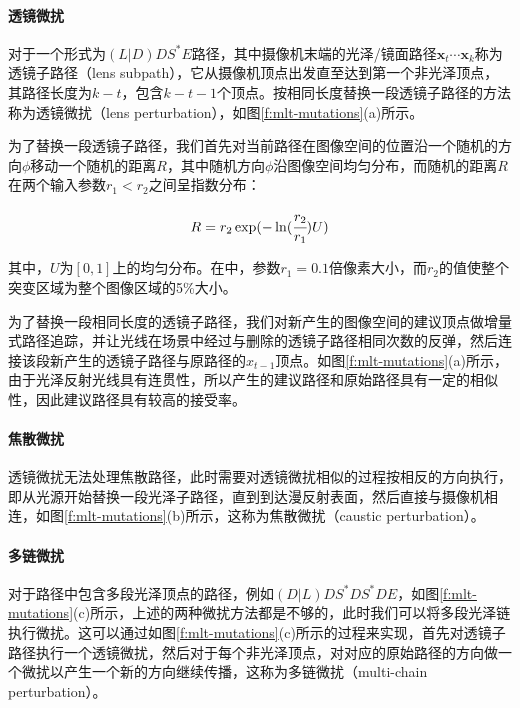 \paragraph{透镜微扰}
对于一个形式为$(L|D)DS^{*}E$路径，其中摄像机末端的光泽/镜面路径$\mathbf{x}_t\cdots\mathbf{x}_k$称为透镜子路径（lens subpath），它从摄像机顶点出发直至达到第一个非光泽顶点，其路径长度为$k-t$，包含$k-t-1$个顶点。按相同长度替换一段透镜子路径的方法称为透镜微扰（lens perturbation），如图\ref{f:mlt-mutations}(a)所示。

为了替换一段透镜子路径，我们首先对当前路径在图像空间的位置沿一个随机的方向$\phi$移动一个随机的距离$R$，其中随机方向$\phi$沿图像空间均匀分布，而随机的距离$R$在两个输入参数$r_1<r_2$之间呈指数分布：

\begin{equation}
	R=r_2\exp(-\ln(\cfrac{r_2}{r_1})U)
\end{equation}

\noindent 其中，$U$为$[0,1]$上的均匀分布。在\cite{a:MetropolisLightTransport}中，参数$r_1=0.1$倍像素大小，而$r_2$的值使整个突变区域为整个图像区域的5\%大小。

为了替换一段相同长度的透镜子路径，我们对新产生的图像空间的建议顶点做增量式路径追踪，并让光线在场景中经过与删除的透镜子路径相同次数的反弹，然后连接该段新产生的透镜子路径与原路径的$x_{t-1}$顶点。如图\ref{f:mlt-mutations}(a)所示，由于光泽反射光线具有连贯性，所以产生的建议路径和原始路径具有一定的相似性，因此建议路径具有较高的接受率。




\paragraph{焦散微扰}
透镜微扰无法处理焦散路径，此时需要对透镜微扰相似的过程按相反的方向执行，即从光源开始替换一段光泽子路径，直到到达漫反射表面，然后直接与摄像机相连，如图\ref{f:mlt-mutations}(b)所示，这称为焦散微扰（caustic perturbation）。



\paragraph{多链微扰}
对于路径中包含多段光泽顶点的路径，例如$(D|L)DS^{*}DS^{*}DE$，如图\ref{f:mlt-mutations}(c)所示，上述的两种微扰方法都是不够的，此时我们可以将多段光泽链执行微扰。这可以通过如图\ref{f:mlt-mutations}(c)所示的过程来实现，首先对透镜子路径执行一个透镜微扰，然后对于每个非光泽顶点，对对应的原始路径的方向做一个微扰以产生一个新的方向继续传播，这称为多链微扰（multi-chain perturbation）。




